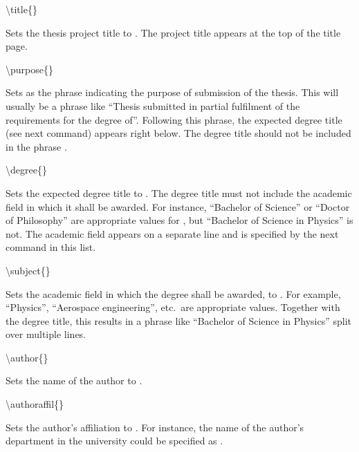 \documentclass[twoside,openany]{thesis}
\begin{document}
\begin{listing}

\item   {\ttfamily\textbackslash title\{<project-title>\}}

        Sets the thesis project title to {}.
        The project title appears at the top of the title page.

\item   {\ttfamily\textbackslash purpose\{<submission-purpose>\}}

        Sets {} as the phrase indicating the purpose of submission of the thesis.
        This will usually be a phrase like ``Thesis submitted in partial fulfilment of the requirements for the degree of''.
        Following this phrase, the expected degree title (see next command) appears right below.
        The degree title should not be included in the phrase {}.

\item   {\ttfamily\textbackslash degree\{<expected-degree>\}}

        Sets the expected degree title to {}.
        The degree title must not include the academic field in which it shall be awarded.
        For instance, ``Bachelor of Science'' or ``Doctor of Philosophy'' are appropriate values for {}, but ``Bachelor of Science in Physics'' is not.
        The academic field appears on a separate line and is specified by the next command in this list.

\item   {\ttfamily\textbackslash subject\{<academic-field>\}}

        Sets the academic field in which the degree shall be awarded, to {}.
        For example, ``Physics'', ``Aerospace engineering'', etc.\ are appropriate values.
        Together with the degree title, this results in a phrase like ``Bachelor of Science in Physics'' split over multiple lines.

\item   {\ttfamily\textbackslash author\{<author-name>\}}

        Sets the name of the author to {}.

\item   {\ttfamily\textbackslash authoraffil\{<author-affiliation>\}}

        Sets the author's affiliation to {}.
        For instance, the name of the author's department in the university could be specified as {}.


\end{listing}
\end{document}
